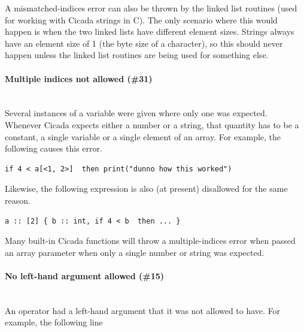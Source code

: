 \documentclass{article}
\newenvironment{code}{
       \begin{list}{}{
               \setlength{\leftmargin}{.4in}
               \setlength{\rightmargin}{0in}
               \setlength{\topsep}{.2in}
       }
       \small
       \item[] }
       { \end{list}   }
\begin{document}
A mismatched-indices error can also be thrown by the linked list routines (used for working with Cicada strings in C).  The only scenario where this would happen is when the two linked lists have different element sizes.  Strings always have an element size of 1 (the byte size of a character), so this should never happen unless the linked list routines are being used for something else.\\








\paragraph{Multiple indices not allowed (\#31)\\\\}

Several instances of a variable were given where only one was expected.  Whenever Cicada expects either a number or a string, that quantity has to be a constant, a single variable or a single element of an array.  For example, the following causes this error.

\begin{code} \begin{verbatim}
if 4 < a[<1, 2>]  then print("dunno how this worked")
\end{verbatim} \end{code}

\noindent Likewise, the following expression is also (at present) disallowed for the same reason.

\begin{code} \begin{verbatim}
a :: [2] { b :: int, if 4 < b  then ... }
\end{verbatim} \end{code}

Many built-in Cicada functions will throw a multiple-indices error when passed an array parameter when only a single number or string was expected.\\




\paragraph{No left-hand argument allowed (\#15)\\\\}

An operator had a left-hand argument that it was not allowed to have.  For example, the following line
\end{document}
